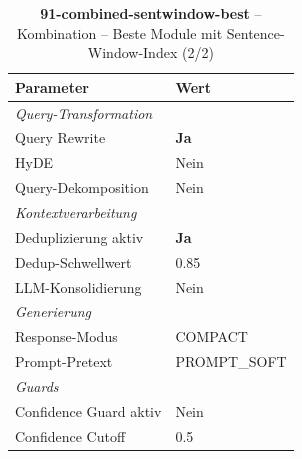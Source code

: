 \begin{table}[H]
\centering
\small
\setlength{\tabcolsep}{4pt}
\begin{tabular}{lp{8cm}}
\toprule
\textbf{Parameter} & \textbf{Wert} \\
\midrule
\multicolumn{2}{l}{\textit{Query-Transformation}} \\
\midrule
\quad Query Rewrite & \textbf{Ja} \\
\quad HyDE & Nein \\
\quad Query-Dekomposition & Nein \\
\midrule
\multicolumn{2}{l}{\textit{Kontextverarbeitung}} \\
\midrule
\quad Deduplizierung aktiv & \textbf{Ja} \\
\quad Dedup-Schwellwert & 0.85 \\
\quad LLM-Konsolidierung & Nein \\
\midrule
\multicolumn{2}{l}{\textit{Generierung}} \\
\midrule
\quad Response-Modus & COMPACT \\
\quad Prompt-Pretext & PROMPT\_SOFT \\
\midrule
\multicolumn{2}{l}{\textit{Guards}} \\
\midrule
\quad Confidence Guard aktiv & Nein \\
\quad Confidence Cutoff & 0.5 \\
\bottomrule
\end{tabular}
\caption{\textbf{91-combined-sentwindow-best} -- Kombination -- Beste Module mit Sentence-Window-Index (2/2)}
\label{tab:config_91_combined_sentwindow_best_b}
\end{table}
